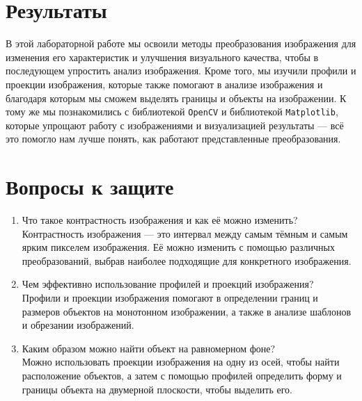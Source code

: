 \documentclass[a4paper,12pt]{article}
\begin{document}
\section{Результаты}
В этой лабораторной работе мы освоили методы преобразования изображения для изменения его характеристик и улучшения визуального качества, чтобы в последующем упростить анализ изображения. Кроме того, мы изучили профили и проекции изображения, которые также помогают в анализе изображения и благодаря которым мы сможем выделять границы и объекты на изображении. К тому же мы познакомились с библиотекой \verb|OpenCV| и библиотекой \verb|Matplotlib|, которые упрощают работу с изображениями и визуализацией результаты --- всё это помогло нам лучше понять, как работают представленные преобразования.

\section{Вопросы к защите}
\begin{enumerate}
    \item Что такое контрастность изображения и как её можно изменить?\\[0.5em]
    Контрастность изображения --- это интервал между самым тёмным и самым ярким пикселем изображения. Её можно изменить с помощью различных преобразований, выбрав наиболее подходящие для конкретного изображения.
    \item Чем эффективно использование профилей и проекций изображения?\\[0.5em]
    Профили и проекции изображения помогают в определении границ и размеров объектов на монотонном изображении, а также в анализе шаблонов и обрезании изображений.
    \item Каким образом можно найти объект на равномерном фоне?\\[0.5em]
    Можно использовать проекции изображения на одну из осей, чтобы найти расположение объектов, а затем с помощью профилей определить форму и границы объекта на двумерной плоскости, чтобы выделить его.
\end{enumerate}
\end{document}

